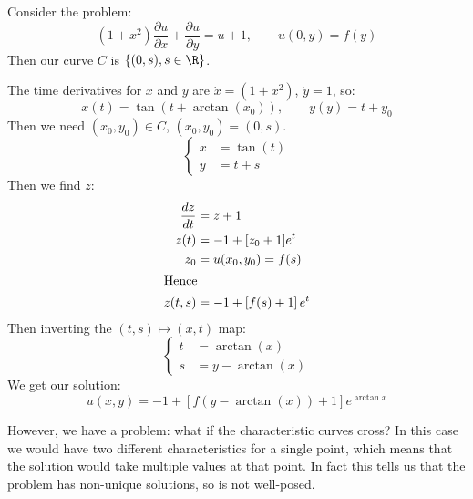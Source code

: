 \documentclass[../Main.tex]{subfiles}
\begin{document}
\begin{example}
    Consider the problem:
    \begin{equation*}
        (1 + x^2) \frac{\partial u}{\partial x} + \frac{\partial u}{\partial y} = u + 1, \qquad u(0, y) = f(y)
    \end{equation*}
    Then our curve $C$ is $\{(0, s), s \in \R\}$.

    The time derivatives for $x$ and $y$ are $\dot{x} = (1 + x^2)$, $\dot{y} = 1$, so:
    \begin{equation*}
        x(t) = \tan(t + \arctan(x_0)), \qquad y(y) = t + y_0
    \end{equation*}
    Then we need $(x_0, y_0) \in C$, $(x_0, y_0) = (0, s)$.
    \begin{equation*}
        \left\{
        \begin{split}
            x &= \tan(t) \\
            y &= t + s
        \end{split}
        \right.
    \end{equation*}
    Then we find $z$:
    \begin{align*}
        \frac{dz}{dt}&= z + 1 \\
        z(t) &= -1 + [z_0 + 1]e^t \\
        z_0 &= u(x_0, y_0) = f(s) \\
        \intertext{Hence}
        z(t, s) &= -1 + \left[f(s) + 1\right]e^t
    \end{align*}
    Then inverting the $(t, s) \mapsto (x, t)$ map:
    \begin{equation*}
        \left\{
        \begin{split}
            t &= \arctan(x) \\
            s &= y - \arctan(x)
        \end{split}
        \right.
    \end{equation*}
    We get our solution:
    \begin{equation*}
        u(x, y) = -1 + \left[f(y - \arctan(x)) + 1\right] e^{\arctan{x}}
    \end{equation*}
\end{example}
However, we have a problem: what if the characteristic curves cross? In this case we would have two different characteristics for a single point, which means that the solution would take multiple values at that point. In fact this tells us that the problem has non-unique solutions, so is not well-posed.
\end{document}
